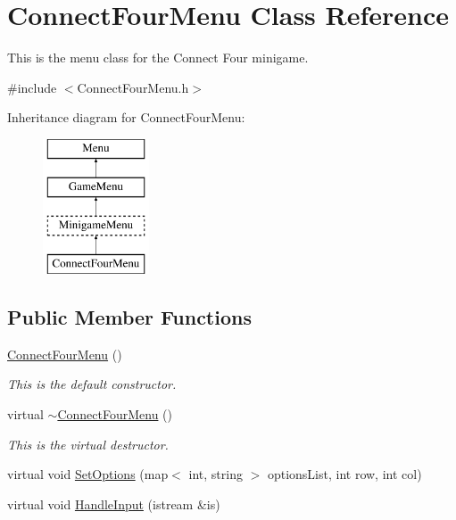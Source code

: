 \hypertarget{classConnectFourMenu}{\section{Connect\-Four\-Menu Class Reference}
\label{classConnectFourMenu}
}


This is the menu class for the Connect Four minigame.  




{\ttfamily \#include $<$Connect\-Four\-Menu.\-h$>$}

Inheritance diagram for Connect\-Four\-Menu\-:\begin{figure}[H]
\begin{center}
\leavevmode
\includegraphics[height=4.000000cm]{classConnectFourMenu}
\end{center}
\end{figure}
\subsection*{Public Member Functions}
\begin{DoxyCompactItemize}
\item 
\hypertarget{classConnectFourMenu_a368513cbf367d7014e664667dbbb94ae}{\hyperlink{classConnectFourMenu_a368513cbf367d7014e664667dbbb94ae}{Connect\-Four\-Menu} ()}\label{classConnectFourMenu_a368513cbf367d7014e664667dbbb94ae}

\begin{DoxyCompactList}\small\item\em This is the default constructor. \end{DoxyCompactList}\item 
\hypertarget{classConnectFourMenu_a53789934922dbbd5bfa5be90e69dfcb4}{virtual \hyperlink{classConnectFourMenu_a53789934922dbbd5bfa5be90e69dfcb4}{$\sim$\-Connect\-Four\-Menu} ()}\label{classConnectFourMenu_a53789934922dbbd5bfa5be90e69dfcb4}

\begin{DoxyCompactList}\small\item\em This is the virtual destructor. \end{DoxyCompactList}\item 
virtual void \hyperlink{classConnectFourMenu_a75979734049cdcb2bae1ad73f57eba46}{Set\-Options} (map$<$ int, string $>$ options\-List, int row, int col)
\item 
virtual void \hyperlink{classConnectFourMenu_a2af0c62dd776dd0e3d8c212f71eb3219}{Handle\-Input} (istream \&is)
\end{DoxyCompactItemize}
